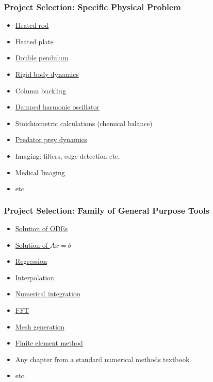 \documentclass[t,12pt,numbers,fleqn]{beamer}
\begin{document}

\begin{frame}
\frametitle{Project Selection: Specific Physical Problem}
\begin{itemize}
\item
  \href{https://ocw.mit.edu/courses/mathematics/18-303-linear-partial-differential-equations-fall-2006/lecture-notes/heateqni.pdf}{
    Heated
    rod}
\item \href{http://www.tech.plym.ac.uk/sme/THER204B-web/Heatran2.PDF}{Heated plate}
\item \href{https://en.wikipedia.org/wiki/Double_pendulum}{Double pendulum}
\item \href{http://chrishecker.com/Rigid_Body_Dynamics}{Rigid body dynamics}
\item Column buckling
\item \href{https://en.wikipedia.org/wiki/Harmonic_oscillator}{Damped harmonic oscillator}
\item Stoichiometric calculations (chemical balance)
\item
  \href{http://www.tiem.utk.edu/~gross/bioed/bealsmodules/predator-prey.html}{Predator
    prey dynamics}
\item Imaging: filters, edge detection etc.
\item Medical Imaging
\item etc.
\end{itemize}

\end{frame}


\begin{frame}
\frametitle{Project Selection: Family of General Purpose Tools}
\begin{itemize}
\item \href{https://en.wikipedia.org/wiki/Numerical_methods_for_ordinary_differential_equations}{Solution of ODEs}
\item \href{https://en.wikibooks.org/wiki/Numerical_Methods/Solution_of_Linear_Equation_Systems}{Solution of $A x = b$}
\item \href{https://en.wikipedia.org/wiki/Linear_regression}{Regression}
\item \href{https://en.wikibooks.org/wiki/Introduction_to_Numerical_Methods/Interpolation}{Interpolation}
\item \href{https://en.wikipedia.org/wiki/Numerical_integration}{Numerical integration}
\item \href{https://en.wikipedia.org/wiki/Fast_Fourier_transform}{FFT}
\item \href{https://en.wikipedia.org/wiki/Mesh_generation}{Mesh generation}
\item \href{https://en.wikipedia.org/wiki/Finite_element_method}{Finite element method}
\item Any chapter from a standard numerical methods textbook
\item etc.
\end{itemize}
\end{frame}
\end{document}

